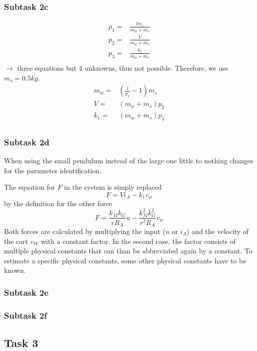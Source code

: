 \documentclass[a4paper, 12pt]{scrartcl}
\begin{document}
\subsubsection{Subtask 2c}
\begin{equation}
	\begin{split}
		p_1 = & \frac{l m_s}{m_w + m_s} \\
		p_2 = & \frac{V}{m_w + m_s} \\
		p_3 = & \frac{k_1}{m_w + m_s} \\
	\end{split}
\end{equation}
$\rightarrow$ three equations but 4 unknowns, thus not possible. Therefore, we use $m_s=0.5kg$. 
\begin{equation}
	\begin{split}
		m_w = & \left(\frac{l}{p_1} - 1\right)m_s \\
		V = & (m_w + m_s)p_2 \\
		k_1 = & (m_w + m_s)p_3 \\
	\end{split}
\end{equation}
\subsubsection{Subtask 2d}

When using the small pendulum instead of the large one little to nothing changes for the parameter identification. 

The equation for $F$ in the system is simply replaced
\begin{equation}
	F = V i_A - k_1 v_w
\end{equation}
by the definition for the other force 
\begin{equation}
	F = \frac{k_M k_G}{r R_A} u - \frac{k_M^2 k_G^2}{r^2 R_A} v_w
\end{equation}
Both forces are calculated by multiplying the input ($u$ or $i_A$) and the velocity of the cart $v_W$ with a constant factor. In the second case, the factor consists of multiple physical constants that can than be abbreviated again by a constant. To estimate a specific physical constants, some other physical constants have to be known.

\subsubsection{Subtask 2e}
\subsubsection{Subtask 2f}

\subsection{Task 3}
\end{document}
